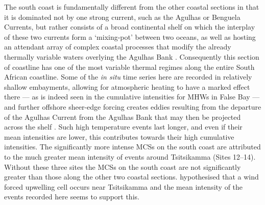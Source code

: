\documentclass[a4paper,10pt,review]{elsarticle}
\begin{document}
The south coast is fundamentally different from the other coastal sections in that it is dominated not by one strong current, such as the Agulhas or Benguela Currents, but rather consists of a broad continental shelf on which the interplay of these two currents form a `mixing-pot' between two oceans, as well as hosting an attendant array of complex coastal processes that modify the already thermally variable waters overlying the Agulhas Bank \citep{Lutjeharms2003, Roberts2005, Hutchings2009}. Consequently this section of coastline has one of the most variable thermal regimes along the entire South African coastline. Some of the \emph{in situ} time series here are recorded in relatively shallow embayments, allowing for atmospheric heating to have a marked effect there --- as is indeed seen in the cumulative intensities for MHWs in False Bay --- and further offshore sheer-edge forcing creates eddies resulting from the departure of the Agulhas Current from the Agulhas Bank that may then be projected across the shelf \citep{Lutjeharms2003}. Such high temperature events last longer, and even if their mean intensities are lower, this contributes towards their high cumulative intensities. The significantly more intense MCSs on the south coast are attributed to the much greater mean intensity of events around Tsitsikamma (Sites 12--14). Without these three sites the MCSs on the south coast are not significantly greater than those along the other two coastal sections. \citep{Roberts2005} hypothesised that a wind forced upwelling cell occurs near Tsitsikamma and the mean intensity of the events recorded here seems to support this.
\end{document}
